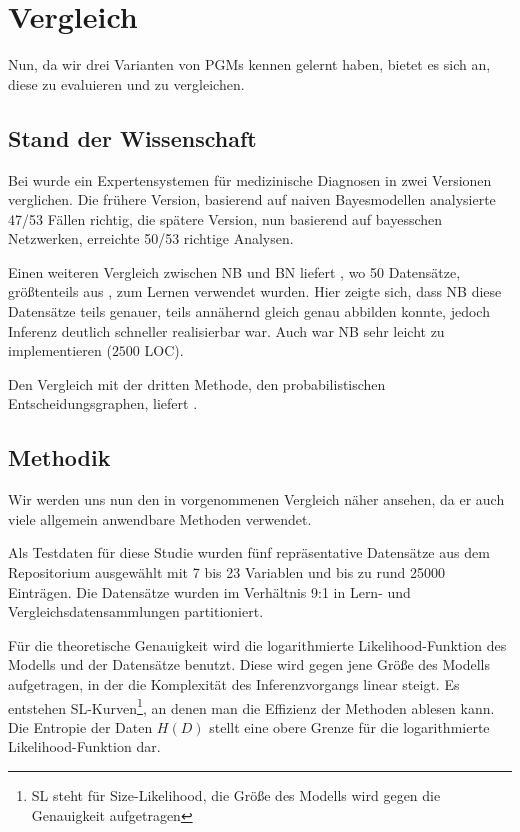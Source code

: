\documentclass{llncs}
\begin{document}
\section{Vergleich}

Nun, da wir drei Varianten von PGMs kennen gelernt haben, bietet es sich an, diese zu evaluieren und zu vergleichen. 

\subsection{Stand der Wissenschaft}

Bei \cite{heckerman1992evaluation} wurde ein Expertensystemen für medizinische Diagnosen in zwei Versionen verglichen. Die frühere Version, basierend auf naiven Bayesmodellen analysierte 47/53 Fällen richtig, die spätere Version, nun basierend auf bayesschen Netzwerken, erreichte 50/53 richtige Analysen. 

Einen weiteren Vergleich zwischen NB und BN liefert \cite{lowd2005naive}, wo 50 Datensätze, größtenteils aus \cite{bache2013machine}, zum Lernen verwendet wurden. Hier zeigte sich, dass NB diese Datensätze teils genauer, teils an­nä­hernd gleich genau abbilden konnte, jedoch Inferenz deutlich schneller realisierbar war. Auch war NB sehr leicht zu implementieren ($2500$ LOC). 

Den Vergleich mit der dritten Methode, den probabilistischen Entscheidungsgraphen, liefert \cite{nielsen2006empirical}.

\subsection{Methodik}

Wir werden uns nun den in \cite{nielsen2006empirical} vorgenommenen Vergleich näher ansehen, da er auch viele allgemein anwendbare Methoden verwendet. 

Als Testdaten für diese Studie wurden fünf repräsentative Datensätze aus dem Repositorium \cite{bache2013machine} ausgewählt mit 7 bis 23 Variablen und bis zu rund 25000 Einträgen. Die Datensätze wurden im Verhältnis 9:1 in Lern- und Vergleichsdatensammlungen partitioniert. 

Für die theoretische Genauigkeit wird die logarithmierte Likelihood-Funktion des Modells und der Datensätze benutzt. Diese wird gegen jene Größe des Modells aufgetragen, in der die Komplexität des Inferenzvorgangs linear steigt. Es entstehen SL-Kurven\footnote{SL steht für Size-Likelihood, die Größe des Modells wird gegen die Genauigkeit aufgetragen}, an denen man die Effizienz der Methoden ablesen kann. Die Entropie der Daten $H(D)$ stellt eine obere Grenze für die logarithmierte Likelihood-Funktion dar. 
\end{document}
